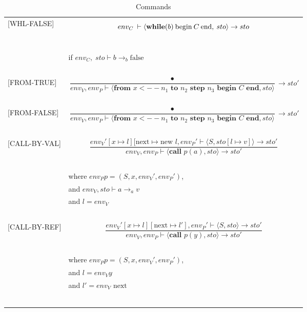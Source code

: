 \begin{longtable}{l l}
[WHL-FALSE] & \[env_C \: \vdash \langle \text{\textbf{while}}(b) \: \text{begin} \: C \: \text{end}, \: sto \rangle \rightarrow sto\] \\
~ & ~ \\
~ & \indent\indent if $env_C, \; sto \vdash b \rightarrow_b \text{false}$ \\
~ & ~ \\

[FROM-TRUE] & \[\frac{•}{env_V, env_P \vdash \langle \textbf{from } x <-- n_1 \textbf{ to } n_2 \textbf{ step } n_3 \textbf{ begin } C \textbf{ end}, sto\rangle} \rightarrow sto'\] \\
~ & ~ \\

[FROM-FALSE] & \[\frac{•}{env_V, env_P \vdash \langle \textbf{from } x <-- n_1 \textbf{ to } n_2 \textbf{ step } n_3 \textbf{ begin } C \textbf{ end}, sto\rangle} \rightarrow sto'\] \\
~ & ~ \\

[CALL-BY-VAL] & \[\frac{env_V'[x \mapsto l][\text{next} \mapsto \text{new } l, env_P' \vdash \langle S, sto[l \mapsto v] \rangle \rightarrow sto'}{env_V, env_P \vdash \langle \textbf{call } p(a), sto \rangle \rightarrow sto'}\] \\
~ & ~ \\
~ & \indent\indent where $env_P p = (S, x, env_V', env_P')$, \\
~ & \indent\indent and $env_V, sto \vdash a \rightarrow_a v$ \\
~ & \indent\indent and $l = env_V$ \\
~ & ~ \\

[CALL-BY-REF] & \[\frac{env_V'[x \mapsto l][\text{next} \mapsto l'], env_P' \vdash \langle S, sto \rangle \rightarrow sto'}{env_V, env_P \vdash \langle \textbf{call } p(y), sto \rangle \rightarrow sto'}\] \\
~ & ~ \\
~ & \indent\indent where $env_P p = (S, x, env_V', env_P')$, \\
~ & \indent\indent and $l = env_V y$ \\
~ & \indent\indent and $l' = env_V \text{ next}$ \\
~ & ~ \\

\caption{Commands}
\end{longtable}


